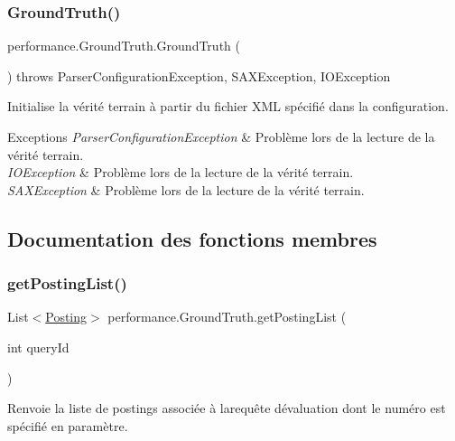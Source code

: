 \subsubsection{\texorpdfstring{Ground\+Truth()}{GroundTruth()}}
{\footnotesize\ttfamily performance.\+Ground\+Truth.\+Ground\+Truth (\begin{DoxyParamCaption}{ }\end{DoxyParamCaption}) throws Parser\+Configuration\+Exception, S\+A\+X\+Exception, I\+O\+Exception}

Initialise la vérité terrain à partir du fichier X\+ML spécifié dans la configuration.


\begin{DoxyExceptions}{Exceptions}
{\em Parser\+Configuration\+Exception} & Problème lors de la lecture de la vérité terrain. \\
\hline
{\em I\+O\+Exception} & Problème lors de la lecture de la vérité terrain. \\
\hline
{\em S\+A\+X\+Exception} & Problème lors de la lecture de la vérité terrain. \\
\hline
\end{DoxyExceptions}


\subsection{Documentation des fonctions membres}
\mbox{\label{classperformance_1_1GroundTruth_aa82e45150e7c33fd11aaccba56f0f1ed}} 
\subsubsection{\texorpdfstring{get\+Posting\+List()}{getPostingList()}}
{\footnotesize\ttfamily List$<$\hyperlink{classindexation_1_1content_1_1Posting}{Posting}$>$ performance.\+Ground\+Truth.\+get\+Posting\+List (\begin{DoxyParamCaption}\item[{int}]{query\+Id }\end{DoxyParamCaption})}

Renvoie la liste de postings associée à larequête d\textquotesingle{}évaluation dont le numéro est spécifié en paramètre.


